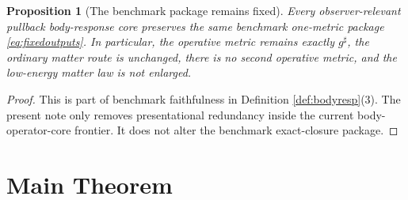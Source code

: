 \documentclass[11pt]{article}
\newcommand{\CompletedMetric}{g^{\sharp}}
\newtheorem{proposition}{Proposition}
\begin{document}
\begin{proposition}[The benchmark package remains fixed]
\label{prop:benchmark}
Every observer-relevant pullback body-response core preserves the same benchmark one-metric package \eqref{eq:fixedoutputs}. In particular, the operative metric remains exactly \(\CompletedMetric\), the ordinary matter route is unchanged, there is no second operative metric, and the low-energy matter law is not enlarged.
\end{proposition}

\begin{proof}
This is part of benchmark faithfulness in Definition \ref{def:bodyresp}(3). The present note only removes presentational redundancy inside the current body-operator-core frontier. It does not alter the benchmark exact-closure package.
\end{proof}

\section{Main Theorem}
\end{document}
